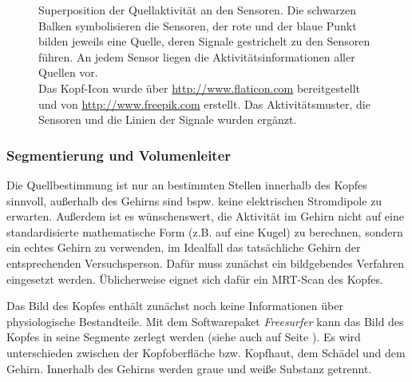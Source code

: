 \documentclass[doc,a4paper,12pt]{apa6}
\makeatletter
\DeclareRobustCommand*{\nameref}[1]{%
      \glqq{\myorg@nameref{#1}}\grqq%
    }%
\makeatother
\begin{document}
\begin{figure}
  \centering
    \setlength{\fboxsep}{8mm}
  \vspace*{3mm}
  \caption[Superposition der Quellaktivität an den Sensoren]{Superposition der Quellaktivität an den Sensoren. Die schwarzen Balken symbolisieren die Sensoren, der rote und der blaue Punkt bilden jeweils eine Quelle, deren Signale gestrichelt zu den Sensoren führen. An jedem Sensor liegen die Aktivitätsinformationen aller Quellen vor.\\ Das Kopf-Icon wurde über \url{http://www.flaticon.com} bereitgestellt und von \url{http://www.freepik.com} erstellt. Das Aktivitätsmuster, die Sensoren und die Linien der Signale wurden ergänzt.}
  \label{img:superposition}
\end{figure}

\subsubsection{Segmentierung und Volumenleiter}
\label{sec:segment}

Die Quellbestimmung ist nur an bestimmten Stellen innerhalb des Kopfes sinnvoll, außerhalb des Gehirns sind bspw. keine elektrischen Stromdipole zu erwarten. Außerdem ist es wünschenswert, die Aktivität im Gehirn nicht auf eine standardisierte mathematische Form (z.B. auf eine Kugel) zu berechnen, sondern ein echtes Gehirn zu verwenden, im Idealfall das tatsächliche Gehirn der entsprechenden Versuchsperson. Dafür muss zunächst ein bildgebendes Verfahren eingesetzt werden. Üblicherweise eignet sich dafür ein MRT-Scan des Kopfes.

Das Bild des Kopfes enthält zunächst noch keine Informationen über physiologische Bestandteile. Mit dem Softwarepaket \emph{Freesurfer} kann das Bild des Kopfes in seine Segmente zerlegt werden (siehe auch \nameref{sec:head-struct} auf Seite \pageref{sec:head-struct}). Es wird unterschieden zwischen der Kopfoberfläche bzw. Kopfhaut, dem Schädel und dem Gehirn. Innerhalb des Gehirns werden graue und weiße Substanz getrennt.
\end{document}
